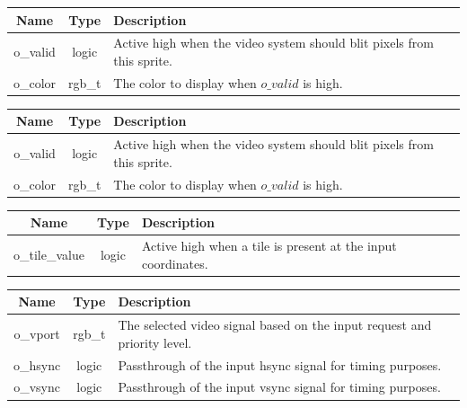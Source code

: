 \documentclass[12pt]{article}
\begin{document}
\vspace{0.5in}
\begingroup
{}
\label{tab:output_becman_sprite}
\begin{tabularx}{\linewidth}{ ||c|c|X|| }
    \hline
    Name & Type & Description \\
    \hline
    o\_valid & logic & Active high when the video system should blit pixels from
    this sprite. \\
    o\_color & rgb\_t & The color to display when $o\_valid$ is high. \\
    \hline
\end{tabularx}
\endgroup

\vspace{0.5in}
\begingroup
{}
\label{tab:output_map_sprite}
\begin{tabularx}{\linewidth}{ ||c|c|X|| }
    \hline
    Name & Type & Description \\
    \hline
    o\_valid & logic & Active high when the video system should blit pixels from
    this sprite. \\
    o\_color & rgb\_t & The color to display when $o\_valid$ is high. \\    
    \hline
\end{tabularx}
\endgroup

\newpage
\begingroup
{}
\label{tab:output_map_ram}
\begin{tabularx}{\linewidth}{ ||c|c|X|| }
    \hline
    Name & Type & Description \\
    \hline
    o\_tile\_value & logic & Active high when a tile is present at the input
    coordinates. \\
    \hline
\end{tabularx}
\endgroup

\vspace{0.5in}
\begingroup
{}
\label{tab:output_map_ram}
\begin{tabularx}{\linewidth}{ ||c|c|X|| }
    \hline
    Name & Type & Description \\
    \hline
    o\_vport & rgb\_t & The selected video signal based on the input request and
    priority level. \\
    o\_hsync & logic & Passthrough of the input hsync signal for timing
    purposes. \\
    o\_vsync & logic & Passthrough of the input vsync signal for timing purposes. \\
    \hline
\end{tabularx}
\endgroup
\end{document}

